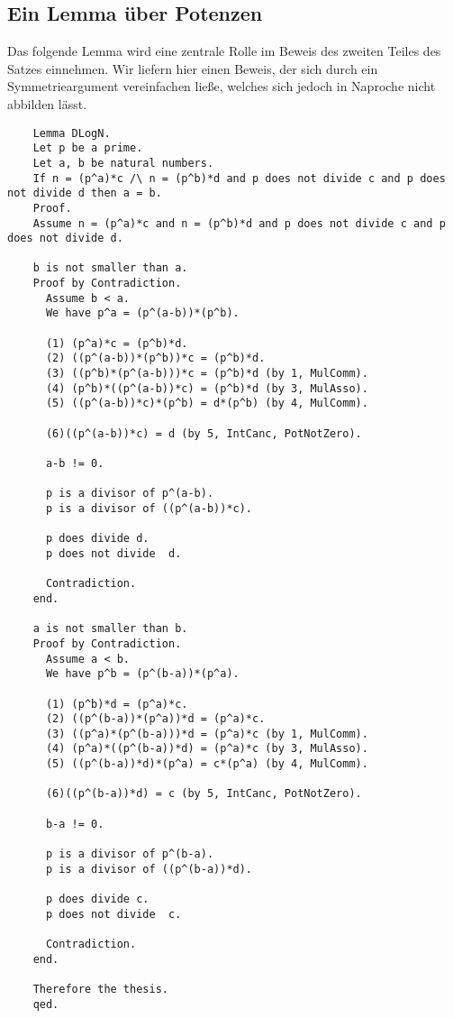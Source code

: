 \documentclass[a4paper,12pt]{scrartcl}
\begin{document}
\subsection{Ein Lemma über Potenzen}

Das folgende Lemma wird eine zentrale Rolle im Beweis des zweiten Teiles des Satzes einnehmen.
Wir liefern hier einen Beweis, der sich durch ein Symmetrieargument vereinfachen ließe, welches sich jedoch in Naproche nicht abbilden lässt.

\begin{lstlisting}
	Lemma DLogN.
	Let p be a prime.
	Let a, b be natural numbers.
	If n = (p^a)*c /\ n = (p^b)*d and p does not divide c and p does not divide d then a = b.
	Proof.
	Assume n = (p^a)*c and n = (p^b)*d and p does not divide c and p does not divide d.
	
	b is not smaller than a.
	Proof by Contradiction.
	  Assume b < a.
	  We have p^a = (p^(a-b))*(p^b).
	
	  (1) (p^a)*c = (p^b)*d.
	  (2) ((p^(a-b))*(p^b))*c = (p^b)*d.
	  (3) ((p^b)*(p^(a-b)))*c = (p^b)*d (by 1, MulComm).
	  (4) (p^b)*((p^(a-b))*c) = (p^b)*d (by 3, MulAsso).
	  (5) ((p^(a-b))*c)*(p^b) = d*(p^b) (by 4, MulComm).
	  
	  (6)((p^(a-b))*c) = d (by 5, IntCanc, PotNotZero).
	  
	  a-b != 0.
	
	  p is a divisor of p^(a-b).
	  p is a divisor of ((p^(a-b))*c).
	
	  p does divide d.
	  p does not divide  d.
	
	  Contradiction.
	end.
	
	a is not smaller than b.
	Proof by Contradiction.
	  Assume a < b.
	  We have p^b = (p^(b-a))*(p^a).
	
	  (1) (p^b)*d = (p^a)*c.
	  (2) ((p^(b-a))*(p^a))*d = (p^a)*c.
	  (3) ((p^a)*(p^(b-a)))*d = (p^a)*c (by 1, MulComm).
	  (4) (p^a)*((p^(b-a))*d) = (p^a)*c (by 3, MulAsso).
	  (5) ((p^(b-a))*d)*(p^a) = c*(p^a) (by 4, MulComm).
	  
	  (6)((p^(b-a))*d) = c (by 5, IntCanc, PotNotZero).
	  
	  b-a != 0.
	
	  p is a divisor of p^(b-a).
	  p is a divisor of ((p^(b-a))*d).
	
	  p does divide c.
	  p does not divide  c.
	
	  Contradiction.
	end.
	
	Therefore the thesis.
	qed.
\end{lstlisting}
\end{document}
